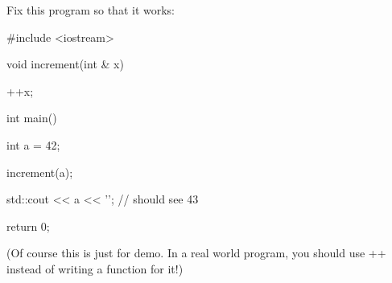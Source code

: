 Fix this program so that it works:



\begin{consolethree}[escapeinside=||]

#include <iostream>



void increment(int & x)

{

    ++x;

}



int main()

{

    int a = 42;

    increment(a);

    std::cout << a << '\n'; // should see 43

    return 0;

}

\end{consolethree}



(Of course this is just for demo. In a real world program, you should use ++ instead of writing a function for it!)

